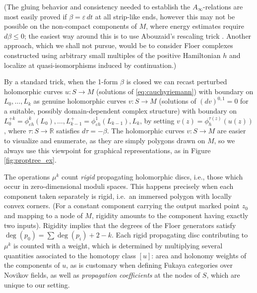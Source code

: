 \documentclass[11pt,leqno]{amsart}
\numberwithin{equation}{section}
\def\R{\mathbb{R}}
\begin{document}
\noindent (The gluing behavior and consistency needed to establish the $A_\infty$-relations are most easily proved if
$\beta=\varepsilon\,dt$ at all strip-like ends, however this may not be possible
on the non-compact components of $M$, where energy estimates require $d\beta\leq 0$; 
the easiest way around this is to use 
Abouzaid's rescaling trick \cite{AbGen}. Another approach, which we shall not pursue, would be to consider Floer complexes
constructed using arbitrary small multiples of the positive Hamiltonian $h$
and localize at quasi-isomorphisms induced by continuation.)

By a standard trick, when the 1-form $\beta$ is closed
we can recast perturbed holomorphic curves $u:S\to M$ (solutions of \eqref{eq:cauchyriemann}) with boundary on
$L_0,\dots,L_k$ as genuine holomorphic curves $v:S\to M$ (solutions of $(dv)^{0,1}=0$ for a suitable, possibly domain-dependent complex
structure) with boundary on $L_0^{+k}=\phi_{\varepsilon h}^k(L_0),\dots,L_{k-1}^+=\phi^1_{\varepsilon
h}(L_{k-1}), L_k$, by setting $v(z)=\phi_h^{\tau(z)}(u(z))$, where $\tau:S\to\R$ satisfies $d\tau=-\beta$. 
The holomorphic curves $v:S\to M$ are easier to visualize and enumerate, as they are simply
polygons drawn on $M$, so we always use this viewpoint for graphical representations,
as in Figure \ref{fig:proptree_ex}.

The operations $\mu^k$ count {\em rigid} propagating holomorphic discs,
i.e., those which occur in zero-dimensional moduli spaces. This happens
precisely when each component taken separately is rigid, i.e.\ an immersed
polygon with locally convex corners. (For a constant component carrying the
output marked point $z_0$
and mapping to a node of $M$, rigidity amounts to the component having 
exactly two inputs). Rigidity implies that the degrees
of the Floer generators satisfy $\deg(p_0)=\sum \deg(p_i)+2-k$.
Each rigid propagating disc contributing to $\mu^k$ is counted with a weight, 
which is determined by multiplying
several quantities associated to the homotopy class $[u]$: area and holonomy
weights of the components of $u$, as is customary when defining Fukaya categories
over Novikov fields, as well as {\em propagation coefficients} at the nodes of $S$, which 
are unique to our setting.
\end{document}
